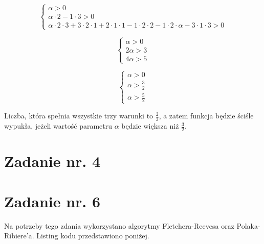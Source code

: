 \documentclass{article}
\begin{document}
\begin{equation}
  \begin{cases}
    \alpha > 0\\
    \alpha \cdot 2 - 1 \cdot 3 > 0\\
    \alpha \cdot 2 \cdot 3 + 3 \cdot 2 \cdot 1 + 2 \cdot 1 \cdot 1 - 1 \cdot 2 \cdot 2 - 
    1 \cdot 2 \cdot \alpha - 3 \cdot 1 \cdot 3 >0
  \end{cases}
\end{equation}

\begin{equation}
  \begin{cases}
    \alpha > 0\\
    2\alpha > 3\\
    4\alpha >5
  \end{cases}
\end{equation}

\begin{equation}
  \begin{cases}
    \alpha > 0\\
    \alpha > \frac{3}{2}\\
    \alpha >\frac{5}{2}
  \end{cases}
\end{equation}


Liczba, która spełnia wszystkie trzy warunki to $\frac{2}{3}$, a zatem funkcja będzie ściśle
wypukła, jeżeli wartość parametru $\alpha$ będzie większa niż $\frac{3}{2}$.

\section{Zadanie nr. 4}

\section{Zadanie nr. 6}

Na potrzeby tego zdania wykorzystano algorytmy Fletchera-Reevesa
oraz Polaka-Ribiere’a. Listing kodu przedstawiono poniżej.
\end{document}
